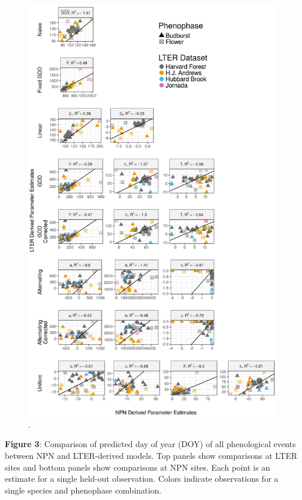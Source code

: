 \documentclass[fleqn,12pt,lineno]{article}
\begin{document}
\begin{figure}[H]
	\centering
		\includegraphics[scale=0.65]{figure_param_comparison.png}
    \caption{.}
\end{figure}


\newpage

\textbf{Figure 3}: Comparison of predicted day of year (DOY) of all phenological events between NPN and LTER-derived models. Top panels show comparisons at LTER sites and bottom panels show comparisons at NPN sites. Each point is an estimate for a single held-out observation. Colors indicate observations for a single species and phenophase combination.
\end{document}
